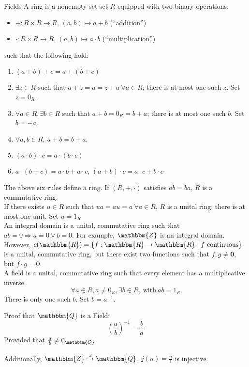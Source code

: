 \documentclass[10pt]{extarticle}
\renewcommand{\mathbf}[1]{\mathbold{#1}}
\newcommand{\Q}{\mathbbm{Q}}
\newcommand{\Z}{\mathbbm{Z}}
\newcommand{\R}{\mathbbm{R}}
\begin{document}
      \begin{problem}{Fields}
        A ring is a nonempty set set $R$ equipped with two binary operations:
        \begin{itemize}
          \item $+: R\times R \rightarrow R$, $(a,b) \mapsto a+b$ (``addition'')
          \item $\cdot: R\times R \rightarrow R$, $(a,b) \mapsto a\cdot b$ (``multiplication'')
        \end{itemize}
        such that the following hold:
        \begin{enumerate}[(1)]
          \item $(a+b)+c = a+(b+c)$
          \item $\exists z\in R$ such that $a+z = a = z+a~\forall a\in R$; there is at most one such $z$. Set $z = 0_R$.
          \item $\forall a\in R,\exists b\in R$ such that $a+b = 0_R = b+a$; there is at most one such $b$. Set $b = -a$.
          \item $\forall a,b\in R,~a+b = b+a$.
          \item $(a\cdot b)\cdot c = a\cdot(b\cdot c)$
          \item $a\cdot(b+c) = a\cdot b + a\cdot c$, $(a+b)\cdot c = a\cdot c + b\cdot c$
        \end{enumerate}
        The above six rules define a ring. If $(R,+,\cdot)$ satisfies $ab = ba$, $R$ is a commutative ring.\\

        If there exists $u\in R$ such that $ua = au = a~\forall a\in R$, $R$ is a unital ring; there is at most one unit. Set $u = 1_R$\\

        An integral domain is a unital, commutative ring such that $ab = 0 \Rightarrow a=0\vee b=0$. For example, $\Z$ is an integral domain. However, $c(\R) = \{f:\R \rightarrow \R\mid f~\text{continuous}\}$ is a unital, commutative ring, but there exist two functions such that $f,g\neq \mathbf{0}$, but $f\cdot g = \mathbf{0}$.\\

        A field is a unital, commutative ring such that every element has a multiplicative inverse.
        \[
          \forall a\in R, a\neq 0_R,\exists b\in R,~\text{with}~ab = 1_R
        \] 
        There is only one such $b$. Set $b = a^{-1}$.
      \begin{problem}{Proof that $\Q$ is a Field:}
        \[
          \left(\frac{a}{b}\right)^{-1} = \frac{b}{a}
        \] 
        Provided that $\frac{a}{b}\neq 0_{\Q}$.
      \end{problem}
      Additionally, $\Z\xhookrightarrow{j}\Q$, $j(n) = \frac{n}{1}$ is injective.
      \end{problem}
\end{document}
